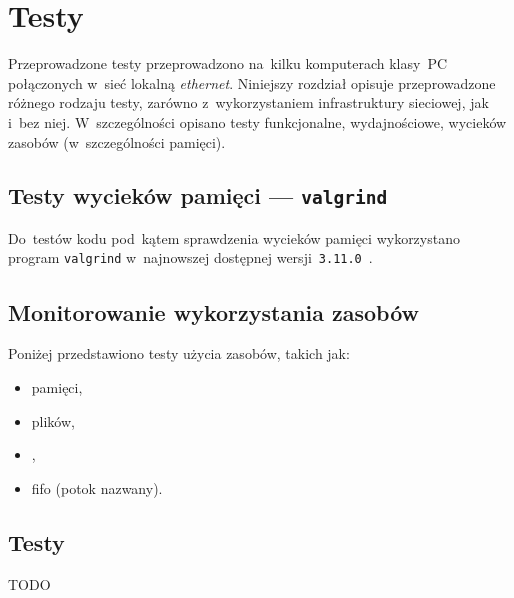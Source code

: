\documentclass[thesis]{subfiles}
\begin{document}
\chapter{Testy}
\label{chapter:testy}

Przeprowadzone testy przeprowadzono na~kilku komputerach klasy~PC połączonych w~sieć lokalną \emph{ethernet}. Niniejszy rozdział opisuje przeprowadzone różnego rodzaju testy, zarówno z~wykorzystaniem infrastruktury sieciowej, jak i~bez niej. W~szczególności opisano testy funkcjonalne, wydajnościowe, wycieków zasobów (w~szczególności pamięci).

\section{Testy wycieków pamięci --- \texttt{valgrind}}

Do~testów kodu pod~kątem sprawdzenia wycieków pamięci wykorzystano program \texttt{valgrind} w~najnowszej dostępnej wersji~\texttt{3.11.0}~\cite{valgrind}.


\section{Monitorowanie wykorzystania zasobów}

\noindent Poniżej przedstawiono testy użycia zasobów, takich jak:
\begin{itemize}
	\item pamięci,
	\item plików,
	\item {},
	\item \gls{fifo} (potok nazwany).
\end{itemize}


\section{Testy}

TODO
\end{document}
